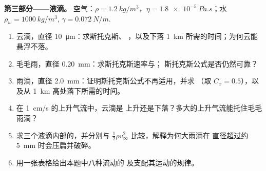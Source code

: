 \begin{problem}
\medskip
\noindent\textbf{第三部分——液滴。}
空气：$\rho = \qty{1.2}{kg/m^3}$，$\eta = \qty{1.8e-5}{Pa.s}$；水 $\rho_w =
\qty{1000}{kg/m^3}$, $\gamma = \qty{0.072}{N/m}$.
\begin{enumerate}[resume]
  \item 云滴，直径 \qty{10}{\micro m}：求斯托克斯、
        ，以及下落 \qty{1}{km} 所需的时间；为何云能悬浮不落。
  \item 毛毛雨，直径 \qty{0.20}{mm}：求斯托克斯速率与；
        斯托克斯公式是否仍然可靠？
  \item 雨滴，直径 \qty{2.0}{mm}：证明斯托克斯公式不再适用，并求
        （取 $C_x = 0.5$），以及从 \qty{1}{km} 高处落下所需的时间。
  \item 在 \qty{1}{cm/s} 的上升气流中，云滴是
        上升还是下落？多大的上升气流能托住毛毛雨滴？
  \item 求三个液滴内部的，并分别与
         $\tfrac12\rho v_\infty^2$ 比较，解释为何大雨滴在
        直径超过约 \qty{5}{mm} 时会压扁并破碎。
  \item 用一张表格给出本题中八种流动的
        及支配其运动的规律。
\end{enumerate}
\end{problem}
